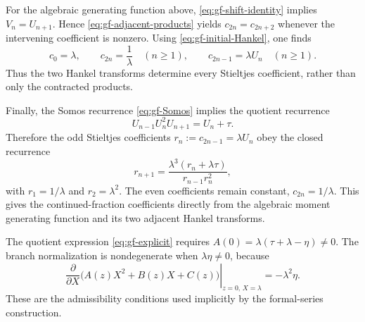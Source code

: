 \documentclass[11pt]{article}
\theoremstyle{remark}
\begin{document}
For the algebraic generating function above,
\eqref{eq:gf-shift-identity} implies $V_n=U_{n+1}$.  Hence
\eqref{eq:gf-adjacent-products} yields
$c_{2n}=c_{2n+2}$ whenever the intervening coefficient is nonzero.  Using
\eqref{eq:gf-initial-Hankel}, one finds
\begin{equation}
 c_0=\lambda,\qquad c_{2n}=\frac1\lambda\quad(n\geq1),\qquad
 c_{2n-1}=\lambda U_n\quad(n\geq1).
 \label{eq:gf-explicit-S-coefficients}
\end{equation}
Thus the two Hankel transforms determine every Stieltjes coefficient, rather
than only the contracted products.

Finally, the Somos recurrence \eqref{eq:gf-Somos} implies the quotient
recurrence
\begin{equation}
 U_{n-1}U_n^2U_{n+1}=U_n+\tau.
 \label{eq:gf-U-recurrence}
\end{equation}
Therefore the odd Stieltjes coefficients
$r_n:=c_{2n-1}=\lambda U_n$ obey the closed recurrence
\begin{equation}
 r_{n+1}=\frac{\lambda^3(r_n+\lambda\tau)}{r_{n-1}r_n^2},
 \label{eq:gf-odd-c-recurrence}
\end{equation}
with $r_1=1/\lambda$ and $r_2=\lambda^2$.  The even coefficients remain
constant, $c_{2n}=1/\lambda$.  This gives the continued-fraction coefficients
directly from the algebraic moment generating function and its two adjacent
Hankel transforms.

The quotient expression \eqref{eq:gf-explicit} requires
$A(0)=\lambda(\tau+\lambda-\eta)\neq0$.  The branch normalization is
nondegenerate when $\lambda\eta\neq0$, because
\[
 \left.\frac{\partial}{\partial X}
 \bigl(A(z)X^2+B(z)X+C(z)\bigr)\right|_{z=0,\,X=\lambda}
 =-\lambda^2\eta.
\]
These are the admissibility conditions used implicitly by the formal-series
construction.  
\end{document}
